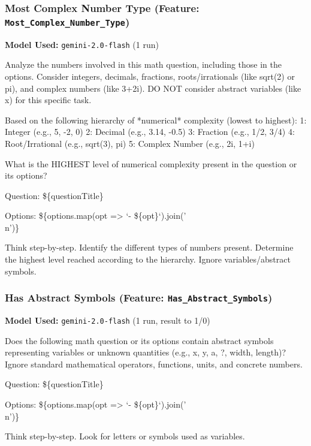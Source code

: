 \documentclass[
    a4paper, %
    10pt, %
    twoside, %
]{LTJournalArticle}
\begin{document}
\subsubsection{Most Complex Number Type (Feature: \texttt{Most\_Complex\_Number\_Type})}
\label{app:prompt_complex_number_type}
\textbf{Model Used:} \texttt{gemini-2.0-flash} (1 run)
\begin{promptbox}
Analyze the numbers involved in this math question, including those in the options.
Consider integers, decimals, fractions, roots/irrationals (like sqrt(2) or pi), and complex numbers (like 3+2i).
DO NOT consider abstract variables (like x) for this specific task.

Based on the following hierarchy of *numerical* complexity (lowest to highest):
1: Integer (e.g., 5, -2, 0)
2: Decimal (e.g., 3.14, -0.5)
3: Fraction (e.g., 1/2, 3/4)
4: Root/Irrational (e.g., sqrt(3), pi)
5: Complex Number (e.g., 2i, 1+i)

What is the HIGHEST level of numerical complexity present in the question or its options?

Question:
\$\{questionTitle\}

Options:
\$\{options.map(opt => `- \$\{opt\}`).join('\\n')\}

Think step-by-step. Identify the different types of numbers present. Determine the highest level reached according to the hierarchy. Ignore variables/abstract symbols.
\end{promptbox}

\subsubsection{Has Abstract Symbols (Feature: \texttt{Has\_Abstract\_Symbols})}
\label{app:prompt_has_abstract_symbols}
\textbf{Model Used:} \texttt{gemini-2.0-flash} (1 run, result to 1/0)
\begin{promptbox}
Does the following math question or its options contain abstract symbols representing variables or unknown quantities (e.g., x, y, a, ?, width, length)? Ignore standard mathematical operators, functions, units, and concrete numbers.

Question:
\$\{questionTitle\}

Options:
\$\{options.map(opt => `- \$\{opt\}`).join('\\n')\}

Think step-by-step. Look for letters or symbols used as variables.
\end{promptbox}
\end{document}
